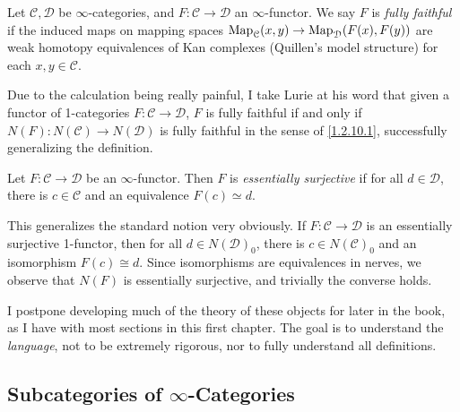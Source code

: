 \begin{definition}\label{1.2.10.1}
	Let $\mathcal{C} ,\mathcal{D} $ be $\infty $-categories, and $F : \mathcal{C}  \to \mathcal{D} $ an $\infty $-functor. We say $F$ is \emph{fully faithful} if the induced maps on mapping spaces $\operatorname{Map}_{\mathcal{C} }(x, y) \to \operatorname{Map}_{\mathcal{D} }(F(x), F(y)) $ are weak homotopy equivalences of Kan complexes (Quillen's model structure) for each $x,y\in \mathcal{C} $.
\end{definition}

Due to the calculation being really painful, I take Lurie at his word that given a functor of 1-categories $F : \mathcal{C}  \to \mathcal{D} $, $F$ is fully faithful if and only if $N(F): N(\mathcal{C} ) \to N(\mathcal{D} )$ is fully faithful in the sense of \cref{1.2.10.1}, successfully generalizing the definition.

\begin{definition}\label{1.2.10.2}
	Let $F : \mathcal{C}  \to \mathcal{D} $ be an $\infty $-functor. Then $F$ is \emph{essentially surjective} if for all $d\in \mathcal{D} $, there is $c\in \mathcal{C} $ and an equivalence $F(c)\simeq d$.
\end{definition}

This generalizes the standard notion very obviously. If $F : \mathcal{C}  \to \mathcal{D} $ is an essentially surjective 1-functor, then for all $d\in N(\mathcal{D} )_0$, there is $c\in N(\mathcal{C} )_0$ and an isomorphism $F(c)\cong d$. Since isomorphisms are equivalences in nerves, we observe that $N(F)$ is essentially surjective, and trivially the converse holds.

I postpone developing much of the theory of these objects for later in the book, as I have with most sections in this first chapter. The goal is to understand the \emph{language}, not to be extremely rigorous, nor to fully understand all definitions.

\subsection{Subcategories of $\infty $-Categories}

